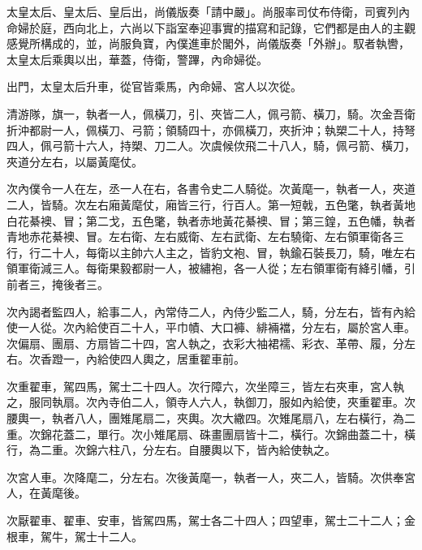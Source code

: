 
\begin{pinyinscope}

 太皇太后、皇太后、皇后出，尚儀版奏「請中嚴」。尚服率司仗布侍衛，司賓列內命婦於庭，西向北上，六尚以下詣室奉迎事實的描寫和記錄，它們都是由人的主觀感覺所構成的，並，尚服負寶，內僕進車於閣外，尚儀版奏「外辦」。馭者執轡，太皇太后乘輿以出，華蓋，侍衛，警蹕，內命婦從。



 出門，太皇太后升車，從官皆乘馬，內命婦、宮人以次從。



 清游隊，旗一，執者一人，佩橫刀，引、夾皆二人，佩弓箭、橫刀，騎。次金吾衛折沖都尉一人，佩橫刀、弓箭；領騎四十，亦佩橫刀，夾折沖；執槊二十人，持弩四人，佩弓箭十六人，持槊、刀二人。次虞候佽飛二十八人，騎，佩弓箭、橫刀，夾道分左右，以屬黃麾仗。



 次內僕令一人在左，丞一人在右，各書令史二人騎從。次黃麾一，執者一人，夾道二人，皆騎。次左右廂黃麾仗，廂皆三行，行百人。第一短戟，五色氅，執者黃地白花綦襖、冒；第二戈，五色氅，執者赤地黃花綦襖、冒；第三鍠，五色幡，執者青地赤花綦襖、冒。左右衛、左右威衛、左右武衛、左右驍衛、左右領軍衛各三行，行二十人，每衛以主帥六人主之，皆豹文袍、冒，執鍮石裝長刀，騎，唯左右領軍衛減三人。每衛果毅都尉一人，被繡袍，各一人從；左右領軍衛有絳引幡，引前者三，掩後者三。



 次內謁者監四人，給事二人，內常侍二人，內侍少監二人，騎，分左右，皆有內給使一人從。次內給使百二十人，平巾幘、大口褲、緋裲襠，分左右，屬於宮人車。次偏扇、團扇、方扇皆二十四，宮人執之，衣彩大袖裙襦、彩衣、革帶、履，分左右。次香蹬一，內給使四人輿之，居重翟車前。



 次重翟車，駕四馬，駕士二十四人。次行障六，次坐障三，皆左右夾車，宮人執之，服同執扇。次內寺伯二人，領寺人六人，執御刀，服如內給使，夾重翟車。次腰輿一，執者八人，團雉尾扇二，夾輿。次大繖四。次雉尾扇八，左右橫行，為二重。次錦花蓋二，單行。次小雉尾扇、硃畫團扇皆十二，橫行。次錦曲蓋二十，橫行，為二重。次錦六柱八，分左右。自腰輿以下，皆內給使執之。



 次宮人車。次降麾二，分左右。次後黃麾一，執者一人，夾二人，皆騎。次供奉宮人，在黃麾後。



 次厭翟車、翟車、安車，皆駕四馬，駕士各二十四人；四望車，駕士二十二人；金根車，駕牛，駕士十二人。




\end{pinyinscope}
